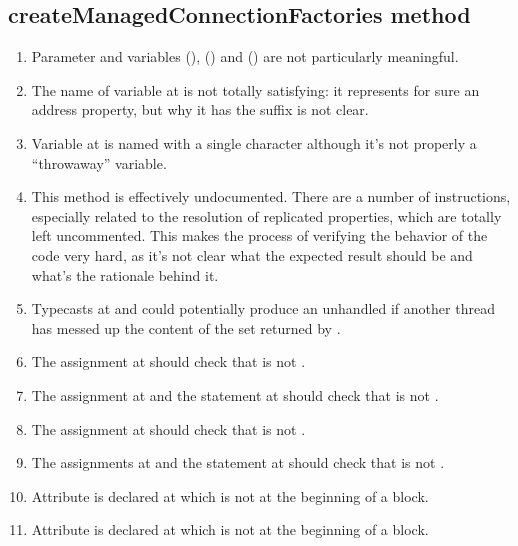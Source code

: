 \subsection{createManagedConnectionFactories method}
\begin{enumerate}
	\item {} Parameter  and variables  (),  () and  () are not particularly meaningful. 
	\item {} The name of variable  at  is not totally satisfying: it represents for sure an address property, but why it has the  suffix is not clear. 
	\item {} Variable  at  is named with a single character although it's not properly a “throwaway” variable. 
	\item {} This method is effectively undocumented. There are a number of instructions, especially related to the resolution of replicated properties, which are totally left uncommented. This makes the process of verifying the behavior of the code very hard, as it's not clear what the expected result should be and what's the rationale behind it. 
	\item {} Typecasts at  and  could potentially produce an unhandled  if another thread has messed up the content of the set returned by .
	\item {} The assignment at  should check that  is not . 
	\item {} The assignment at  and the  statement at  should check that  is not .
	\item {} The assignment at  should check that  is not .
	\item {} The assignments at  and the  statement at  should check that  is not .
	\item {} Attribute  is declared at  which is not at the beginning of a block. 
	\item {} Attribute  is declared at  which is not at the beginning of a block.

\end{enumerate}

